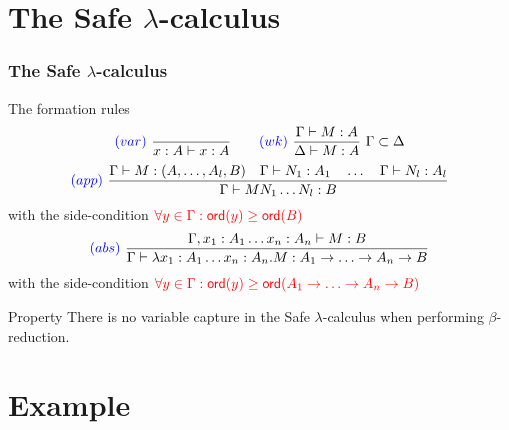 \section{The Safe \texorpdfstring{$\lambda$}{lambda}-calculus}
\begin{frame} \frametitle{The Safe $\lambda$-calculus}
\begin{block}{The formation rules}
$$ \textcolor{blue}{(var)} \   \frac{\displaystyle }{x : A\vdash x : A}
\qquad  \textcolor{blue}{(wk)} \   \frac{\displaystyle \Gamma \vdash M : A}{\Delta \vdash
M : A} \ \Gamma \subset \Delta$$
$$ \textcolor{blue}{(app)} \  \frac{\displaystyle \Gamma \vdash M : (A,\ldots,A_l,B)
                                        \quad \Gamma \vdash N_1 : A_1
                                        \quad \ldots \quad \Gamma \vdash N_l : A_l  }{\Gamma  \vdash M N_1 \ldots N_l : B}$$
\hfill with the side-condition $\textcolor{red}{\forall y \in \Gamma
: {\sf ord}(y) \geq {\sf ord}(B)}$
$$ \textcolor{blue}{(abs)} \   \frac{\displaystyle \Gamma, x_1:A_1 \ldots x_n : A_n \vdash M : B}{\Gamma  \vdash \lambda x_1:A_1 \ldots x_n : A_n . M : A_1 \rightarrow \ldots \rightarrow A_n \rightarrow B}$$
\hfill with the side-condition $\textcolor{red}{\forall y \in \Gamma
: {\sf ord}(y) \geq {\sf ord}(A_1 \rightarrow \ldots \rightarrow A_n
\rightarrow B)}$
\end{block}
\pause
\begin{block}{Property}
There is no variable capture in the Safe $\lambda$-calculus when
performing $\beta$-reduction.
\end{block}
\end{frame}


\section{Example}





